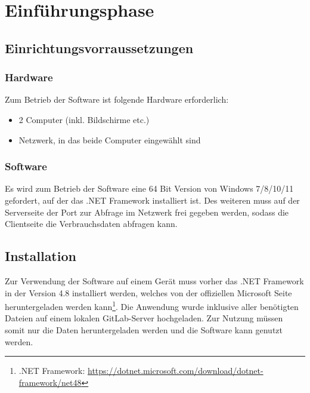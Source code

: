 \section{Einführungsphase}
\label{sec:Einfuehrungsphase}

\subsection{Einrichtungsvorraussetzungen}
\label{sec:Einrichtungsvorraussetzungen}

\subsubsection{Hardware}
\label{sec:HardwareEinrichtung}
Zum Betrieb der Software ist folgende Hardware erforderlich:

\begin{itemize}
	\item 2 Computer (inkl. Bildschirme etc.)
	\item Netzwerk, in das beide Computer eingewählt sind
\end{itemize}

\subsubsection{Software}
\label{sec:SoftwareEinrichtung}
Es wird zum Betrieb der Software eine 64 Bit Version von Windows 7/8/10/11 gefordert, auf der das .NET Framework installiert ist. Des weiteren muss auf der Serverseite der Port zur Abfrage im Netzwerk frei gegeben werden, sodass die Clientseite die Verbrauchsdaten abfragen kann.

\subsection{Installation}
\label{sec:Installation}
Zur Verwendung der Software auf einem Gerät muss vorher das .NET Framework in der Version 4.8 installiert werden, welches von der offiziellen Microsoft Seite heruntergeladen werden kann\footnote{.NET Framework: \url{https://dotnet.microsoft.com/download/dotnet-framework/net48}}. Die Anwendung wurde inklusive aller benötigten Dateien auf einem lokalen {\acs{GitLab}}-Server hochgeladen. Zur Nutzung müssen somit nur die Daten heruntergeladen werden und die Software kann genutzt werden.